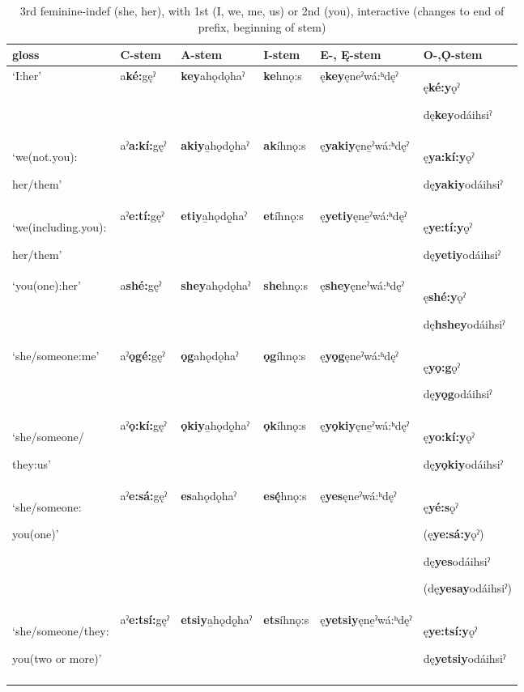 \begin{table}
\caption{3rd feminine-indef (she, her), with 1st (I, we, me, us) or 2nd (you), interactive (changes to end of prefix, beginning of stem)}
\label{tab:1:31pron2}
\tiny{
\begin{tabularx}{\textwidth}{XXXXXX}
\lsptoprule
gloss & C-stem & A-stem & I-stem & E-, Ę{}-stem & O-,Ǫ{}-stem\\
\midrule
‘I:her’ & a\textbf{ké:}gęˀ & \textbf{key}ahǫdǫhaˀ & \textbf{ke}hnǫ:s & ę\textbf{key}ęneˀwá:ʰdęˀ & ę\textbf{ké:y}ǫˀ

dę\textbf{key}odáihsiˀ\\
‘we(not.you):

her/them’ & aˀ\textbf{a:kí:}gęˀ & \textbf{akiy}a̱hǫdǫ̱haˀ & \textbf{ak}íhnǫ:s & ę\textbf{yakiy}ęne̱ˀwá:ʰdęˀ & ę\textbf{ya:kí:y}ǫˀ

dę\textbf{yakiy}odáihsiˀ\\
‘we(including.you):

her/them’ & aˀ\textbf{e:tí:}gęˀ & \textbf{etiy}a̱hǫdǫ̱haˀ & \textbf{et}íhnǫ:s & ę\textbf{yetiy}ęne̱ˀwá:ʰdęˀ & ę\textbf{ye:tí:y}ǫˀ

dę\textbf{yetiy}odáihsiˀ\\
‘you(one):her’ & a\textbf{shé:}gęˀ & \textbf{shey}ahǫdǫhaˀ & \textbf{she}hnǫ:s & ę\textbf{shey}ęneˀwá:ʰdęˀ & ę\textbf{shé:y}ǫˀ

dę\textbf{hshey}odáihsiˀ\\
‘she/someone:me’ & aˀ\textbf{ǫgé:}gęˀ & \textbf{ǫg}ahǫdǫhaˀ & \textbf{ǫg}íhnǫ:s & ę\textbf{yǫg}ęneˀwá:ʰdęˀ & ę\textbf{yǫ:g}ǫˀ

dę\textbf{yǫg}odáihsiˀ\\
‘she/someone/

they:us’ & aˀ\textbf{ǫ:kí:}gęˀ & \textbf{ǫkiy}a̱hǫdǫ̱haˀ & \textbf{ǫk}íhnǫ:s & ę\textbf{yǫkiy}ęne̱ˀwá:ʰdęˀ & ę\textbf{yo:kí:y}ǫˀ

dę\textbf{yǫkiy}odáihsiˀ\\
‘she/someone:

you(one)’ & aˀ\textbf{e:sá:}gęˀ & \textbf{es}ahǫdǫhaˀ & \textbf{es\'{ę}}hnǫ:s & ę\textbf{yes}ęneˀwá:ʰdęˀ & ę\textbf{yé:s}ǫˀ

(ę\textbf{ye:sá:y}ǫˀ)

dę\textbf{yes}odáihsiˀ

(dę\textbf{yesay}odáihsiˀ)\\
‘she/someone/they:

you(two or more)’ & aˀ\textbf{e:tsí:}gęˀ & \textbf{etsiy}a̱hǫdǫ̱haˀ & \textbf{ets}íhnǫ:s & ę\textbf{yetsiy}ęne̱ˀwá:ʰdęˀ & ę\textbf{ye:tsí:y}ǫˀ

dę\textbf{yetsiy}odáihsiˀ\\
\lspbottomrule
\end{tabularx}}
\end{table}


